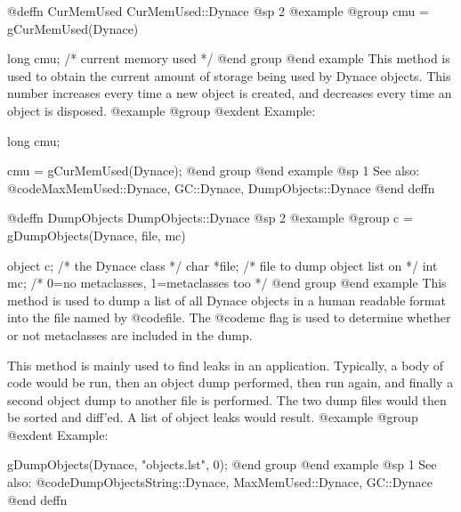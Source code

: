 @deffn {CurMemUsed} CurMemUsed::Dynace
@sp 2
@example
@group
cmu = gCurMemUsed(Dynace)

long    cmu;    /*  current memory used  */
@end group
@end example
This method is used to obtain the current amount of storage being used
by Dynace objects.  This number increases every time a new object is
created, and decreases every time an object is disposed.
@example
@group
@exdent Example:

long    cmu;

cmu = gCurMemUsed(Dynace);
@end group
@end example
@sp 1
See also:  @code{MaxMemUsed::Dynace, GC::Dynace, DumpObjects::Dynace}
@end deffn















@deffn {DumpObjects} DumpObjects::Dynace
@sp 2
@example
@group
c = gDumpObjects(Dynace, file, mc)

object  c;      /*  the Dynace class  */
char    *file;  /*  file to dump object list on  */
int     mc;     /*  0=no metaclasses, 1=metaclasses too  */
@end group
@end example
This method is used to dump a list of all Dynace objects in a human
readable format into the file named by @code{file}.  The @code{mc}
flag is used to determine whether or not metaclasses are included
in the dump.

This method is mainly used to find leaks in an application.  Typically,
a body of code would be run, then an object dump performed, then run again,
and finally a second object dump to another file is performed.  The two
dump files would then be sorted and diff'ed.  A list of object leaks
would result.
@example
@group
@exdent Example:

gDumpObjects(Dynace, "objects.lst", 0);
@end group
@end example
@sp 1
See also:  @code{DumpObjectsString::Dynace, MaxMemUsed::Dynace, GC::Dynace}
@end deffn


























